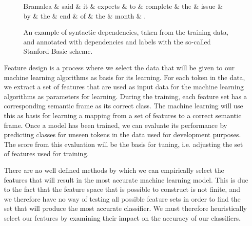 \begin{figure}
    \centering
    \smaller[]
    \smaller[]
    \begin{dependency}[]
        \begin{deptext}[column sep=0.5em, row sep=.1ex]
            Bramalea \& said \& it \& expects \& to \& complete \& the \& issue \& by \& the \& end \& of \& the \& month \& . \\
        \end{deptext}
    \end{dependency}
    \caption{An example of syntactic dependencies, taken from the training data, and annotated with dependencies and labels with the so-called Stanford Basic scheme.}
    \label{DM:syntactic}
\end{figure}

Feature design is a process where we select the data that will be given to our machine learning algorithms as basis for its learning. For each token in the data, we extract a set of features that are used as input data for the machine learning algorithms as parameters for learning. During the training, each feature set has a corresponding semantic frame as its correct class. The machine learning will use this as basis for learning a mapping from a set of features to a correct semantic frame. Once a model has been trained, we can evaluate its performance by predicting classes for unseen tokens in the data used for development purposes. The score from this evaluation will be the basis for tuning, i.e. adjusting the set of features used for training.

There are no well defined methods by which we can empirically select the features that will result in the most accurate machine learning model. This is due to the fact that the feature space that is possible to construct is not finite, and we therefore have no way of testing all possible feature sets in order to find the set that will produce the most accurate classifier. We must therefore heuristically select our features by examining their impact on the accuracy of our classifiers.

